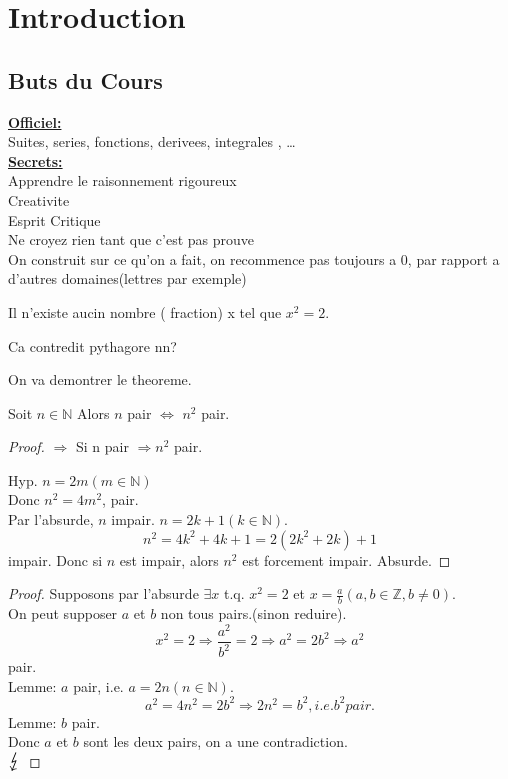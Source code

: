 \documentclass[../main.tex]{subfiles}
\begin{document}

\section{Introduction}
\subsection{Buts du Cours}
\textbf{\underline{Officiel:}}\\
Suites, series, fonctions, derivees, integrales , \ldots\\

\textbf{ \underline{Secrets:}}\\
Apprendre le raisonnement rigoureux\\
Creativite\\
Esprit Critique\\
Ne croyez rien tant que c'est pas prouve\\

On construit sur ce qu'on a fait, on recommence pas toujours a $0$, par rapport a d'autres domaines(lettres par exemple)

\begin{thm}[env. -400]\label{thm:env_400}
	Il n'existe aucin nombre ( fraction) x tel que $x^{2} = 2$.
\end{thm}


Ca contredit pythagore nn?

On va demontrer le theoreme.\\
\begin{lemma}[Lemme]\label{lemma:lemme}
	Soit $n \in \mathbb{N}$ 
	Alors $n$ pair $\iff$  $n^{2}$ pair.
\end{lemma}
\begin{proof}
$\Rightarrow$ Si n pair $\Rightarrow n^{2}$ pair.

Hyp. $n = 2m ( m \in \mathbb{N})$ \\
Donc $n^{2} = 4m^{2}$, pair. \\

Par l'absurde, $n$ impair. $n=2k + 1 ( k \in \mathbb{N})$.\\
\[ 
	n^{2} = 4k^{2} + 4k + 1 = 2 ( 2k^{2} + 2k) + 1
\]
impair.
Donc si $n$ est impair, alors $n^{2}$ est forcement impair.
Absurde. 
\end{proof}
\begin{proof}
	Supposons par l'absurde $\exists x$ t.q. $x^{2} = 2$ et $x= \frac{a}{b} ( a,b \in \mathbb{Z}, b \neq 0)$.\\
	On peut supposer $a$ et $b$ non tous pairs.(sinon reduire).
	\[ 
	x^{2} = 2 \Rightarrow \frac{a^{2}}{b^{2}} = 2 \Rightarrow a^{2} = 2b^{2} \Rightarrow a^{2}
	\] 
	pair.\\
	Lemme: $a$ pair, i.e. $a=2n ( n \in \mathbb{N})$.
	\[ 
	a^{2}=4n^{2} = 2b^{2} \Rightarrow  2 n^{2} = b^{2}, i.e. b^{2} pair.
	\]
	Lemme: $b$ pair.\\
	Donc $a$ et $b$ sont les deux pairs, on a une contradiction.\\
	$\contra$
\end{proof}
\end{document}
